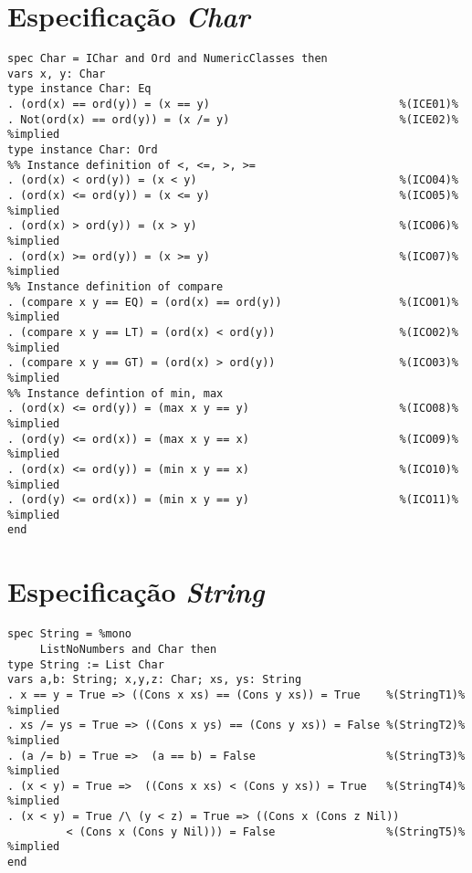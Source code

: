 \section{Especificação \textit{Char}}
\label{appendix:strictSpec:char}
\begin{Verbatim}
spec Char = IChar and Ord and NumericClasses then
vars x, y: Char
type instance Char: Eq
. (ord(x) == ord(y)) = (x == y)                             %(ICE01)%
. Not(ord(x) == ord(y)) = (x /= y)                          %(ICE02)% %implied
type instance Char: Ord
%% Instance definition of <, <=, >, >=
. (ord(x) < ord(y)) = (x < y)                               %(ICO04)%
. (ord(x) <= ord(y)) = (x <= y)                             %(ICO05)% %implied
. (ord(x) > ord(y)) = (x > y)                               %(ICO06)% %implied
. (ord(x) >= ord(y)) = (x >= y)                             %(ICO07)% %implied
%% Instance definition of compare
. (compare x y == EQ) = (ord(x) == ord(y))                  %(ICO01)% %implied
. (compare x y == LT) = (ord(x) < ord(y))                   %(ICO02)% %implied
. (compare x y == GT) = (ord(x) > ord(y))                   %(ICO03)% %implied
%% Instance defintion of min, max
. (ord(x) <= ord(y)) = (max x y == y)                       %(ICO08)% %implied
. (ord(y) <= ord(x)) = (max x y == x)                       %(ICO09)% %implied
. (ord(x) <= ord(y)) = (min x y == x)                       %(ICO10)% %implied
. (ord(y) <= ord(x)) = (min x y == y)                       %(ICO11)% %implied
end
\end{Verbatim}

\section{Especificação \textit{String}}
\label{appendix:strictSpec:string}
\begin{Verbatim}
spec String = %mono
     ListNoNumbers and Char then
type String := List Char
vars a,b: String; x,y,z: Char; xs, ys: String
. x == y = True => ((Cons x xs) == (Cons y xs)) = True    %(StringT1)% %implied
. xs /= ys = True => ((Cons x ys) == (Cons y xs)) = False %(StringT2)% %implied
. (a /= b) = True =>  (a == b) = False                    %(StringT3)% %implied
. (x < y) = True =>  ((Cons x xs) < (Cons y xs)) = True   %(StringT4)% %implied
. (x < y) = True /\ (y < z) = True => ((Cons x (Cons z Nil)) 
         < (Cons x (Cons y Nil))) = False                 %(StringT5)% %implied
end
\end{Verbatim}

